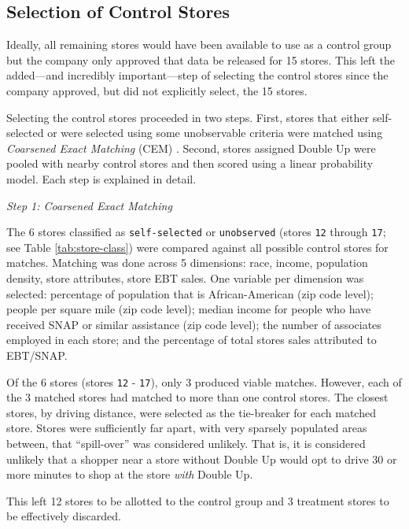\documentclass[12pt,letterpaperpaper,]{book}
\begin{document}
\subsection*{Selection of Control
Stores}\label{selection-of-control-stores}

Ideally, all remaining stores would have been available to use as a
control group but the company only approved that data be released for 15
stores. This left the added---and incredibly important---step of
selecting the control stores since the company approved, but did not
explicitly select, the 15 stores.

Selecting the control stores proceeded in two steps. First, stores that
either self-selected or were selected using some unobservable criteria
were matched using \emph{Coarsened Exact Matching} (CEM)
\citep{iacus_causal_2011}. Second, stores assigned Double Up were pooled
with nearby control stores and then scored using a linear probability
model. Each step is explained in detail.

\emph{Step 1: Coarsened Exact Matching}

The 6 stores classified as \texttt{self-selected} or \texttt{unobserved}
(stores \texttt{12} through \texttt{17}; see Table
\ref{tab:store-class}) were compared against all possible control stores
for matches. Matching was done across 5 dimensions: race, income,
population density, store attributes, store EBT sales. One variable per
dimension was selected: percentage of population that is
African-American (zip code level); people per square mile (zip code
level); median income for people who have received SNAP or similar
assistance (zip code level); the number of associates employed in each
store; and the percentage of total stores sales attributed to EBT/SNAP.

Of the 6 stores (stores \texttt{12} - \texttt{17}), only 3 produced
viable matches. However, each of the 3 matched stores had matched to
more than one control stores. The closest stores, by driving distance,
were selected as the tie-breaker for each matched store. Stores were
sufficiently far apart, with very sparsely populated areas between, that
``spill-over'' was considered unlikely. That is, it is considered
unlikely that a shopper near a store without Double Up would opt to
drive 30 or more minutes to shop at the store \emph{with} Double Up.

This left 12 stores to be allotted to the control group and 3 treatment
stores to be effectively discarded.
\end{document}
